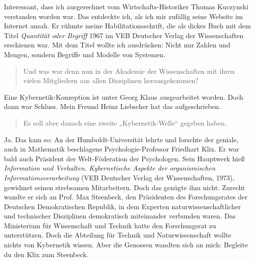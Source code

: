 \documentclass[11pt,a4paper]{article}
\newenvironment{frage}{\begin{quote}}{\end{quote}}
\begin{document}
Interessant, dass ich ausgerechnet vom Wirtschafts-Historiker Thomas Kuczynski
verstanden worden war. Das entdeckte ich, als ich mir zufällig seine Website
im Internet ansah. Er rühmte meine Habilitationsschrift, die als dickes Buch
mit dem Titel \emph{Quantität oder Begriff} 1967 im VEB Deutscher Verlag der
Wissenschaften erschienen war. Mit dem Titel wollte ich ausdrücken: Nicht nur
Zahlen und Mengen, sondern Begriffe und Modelle von Systemen.

\begin{frage}
  Und was war denn nun in der Akademie der Wissenschaften mit ihren vielen
  Mitgliedern aus allen Disziplinen herausgekommen?
\end{frage}
Eine Kybernetik-Konzeption ist unter Georg Klaus ausgearbeitet worden. Doch
dann war Schluss. Mein Freund Heinz Liebscher hat das aufgeschrieben.
\newpage
\begin{frage}
  Es soll aber danach eine zweite „Kybernetik-Welle“ gegeben haben.
\end{frage}
Ja. Das kam so: An der Humboldt-Universität lehrte und forschte der geniale,
auch in Mathematik beschlagene Psychologie-Professor Friedhart Klix. Er war
bald auch Präsident der Welt-Föderation der Psychologen. Sein Hauptwerk hieß
\emph{Information und Verhalten. Kybernetische Aspekte der organismischen
  Informationsverarbeitung} (VEB Deutscher Verlag der Wissenschaften, 1973),
gewidmet seinen strebsamen Mitarbeitern. Doch das genügte ihm nicht. Zurecht
wandte er sich an Prof. Max Steenbeck, den Präsidenten des Forschungsrates der
Deutschen Demokratischen Republik, in dem Experten naturwissenschaftlicher und
technischer Disziplinen demokratisch miteinander verbunden waren. Das
Ministerium für Wissenschaft und Technik hatte den Forschungsrat zu
unterstützen. Doch die Abteilung für Technik und Naturwissenschaft wollte
nichts von Kybernetik wissen. Aber die Genossen wandten sich an mich: Begleite
du den Klix zum Steenbeck.
\end{document}
